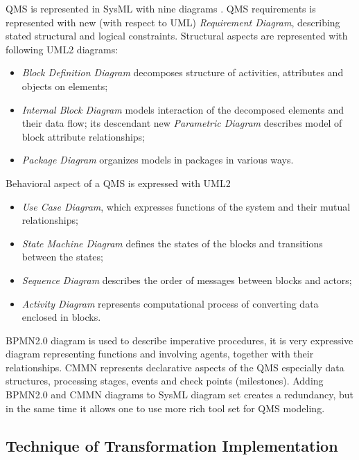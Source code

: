\documentclass[conference]{IEEEtran}
\begin{document}
QMS is represented in SysML with nine diagrams \cite{sysmlpres}.  QMS requirements is represented with new (with respect to UML) \emph{Requirement Diagram}, describing stated structural and logical constraints. Structural aspects are represented with following UML2 diagrams:
\begin{itemize}
\item \emph{Block Definition Diagram} decomposes structure of activities, attributes and objects on elements;
\item \emph{Internal Block Diagram} models interaction of the decomposed elements and their data flow; its descendant new \emph{Parametric Diagram} describes model of block attribute relationships;
\item \emph{Package Diagram} organizes models in packages in various ways.
\end{itemize}
Behavioral aspect of a QMS is expressed with UML2
\begin{itemize}
\item \emph{Use Case Diagram}, which expresses functions of the system and their mutual relationships;
\item \emph{State Machine Diagram} defines the states of the blocks and transitions between the states;
\item \emph{Sequence Diagram} describes the order of messages between blocks and actors;
\item \emph{Activity Diagram} represents computational process of converting data enclosed in blocks.
\end{itemize}

BPMN2.0 diagram is used to describe imperative procedures, it is very expressive diagram representing functions and involving agents, together with their relationships.  CMMN represents declarative aspects of the QMS especially data structures, processing stages, events and check points (milestones).  Adding BPMN2.0 and CMMN diagrams to SysML diagram set creates a redundancy, but in the same time it allows one to use more rich tool set for QMS modeling.

\subsection{Technique of Transformation Implementation}
\label{sec:tech-imp}
\end{document}
